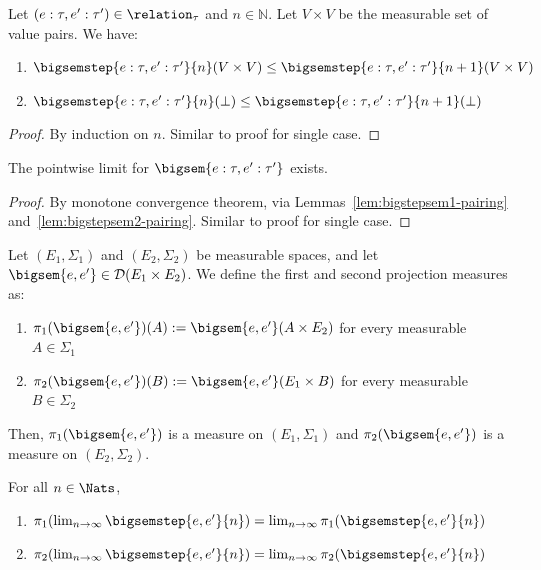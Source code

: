 \begin{lemma}
	Let $(e : \tau, e' : \tau') \in \relation_{\tau}$ and $n \in \mathbb{N}$. Let $V \times V$ be the measurable set of value pairs. We have:
	\begin{enumerate}
		\item\label{lem:bigstepsem1-pairing} $\bigsemstep{e : \tau, e' : \tau'}{n}(V \times V) \leq \bigsemstep{e : \tau, e' : \tau'}{n+1}(V \times V)$
		\item\label{lem:bigstepsem2-pairing} $\bigsemstep{e : \tau, e' : \tau'}{n}(\bot) \leq \bigsemstep{e : \tau, e' : \tau'}{n+1}(\bot)$
	\end{enumerate}
\end{lemma}

\begin{proof}
	By induction on $n$. Similar to proof for single case.
\end{proof}

\begin{lemma}\label{lem:limit-exists-2}
	The pointwise limit for $\bigsem{e : \tau, e' : \tau'}$ exists.
\end{lemma}

\begin{proof}
	By monotone convergence theorem, via Lemmas~\ref{lem:bigstepsem1-pairing} and~\ref{lem:bigstepsem2-pairing}. Similar to proof for single case.
\end{proof}

\begin{definition}
	Let $(E_1, \Sigma_1)$ and $(E_2, \Sigma_2)$ be measurable spaces, and let $\bigsem{e,e'} \in \mathcal{D}(E_1 \times E_2)$. We define the first and second projection measures as:
	\begin{enumerate}
		\item $\pi_1(\bigsem{e,e'})(A) := \bigsem{e,e'}(A \times E_2)$ for every measurable $A \in \Sigma_1$
		\item $\pi_2(\bigsem{e,e'})(B) := \bigsem{e,e'}(E_1 \times B)$ for every measurable $B \in \Sigma_2$
	\end{enumerate}
	Then, $\pi_1(\bigsem{e,e'})$ is a measure on $(E_1, \Sigma_1)$ and $\pi_2(\bigsem{e,e'})$ is a measure on $(E_2, \Sigma_2)$.
\end{definition}

\begin{lemma}
	For all $n \in \Nats$,
	\begin{enumerate}
		\item $\pi_1(\lim_{n \to \infty} \bigsemstep{e,e'}{n}) = \lim_{n \to \infty} \pi_1(\bigsemstep{e,e'}{n})$
		\item $\pi_2(\lim_{n \to \infty} \bigsemstep{e,e'}{n}) = \lim_{n \to \infty} \pi_2(\bigsemstep{e,e'}{n})$ 
	\end{enumerate}
\end{lemma}

